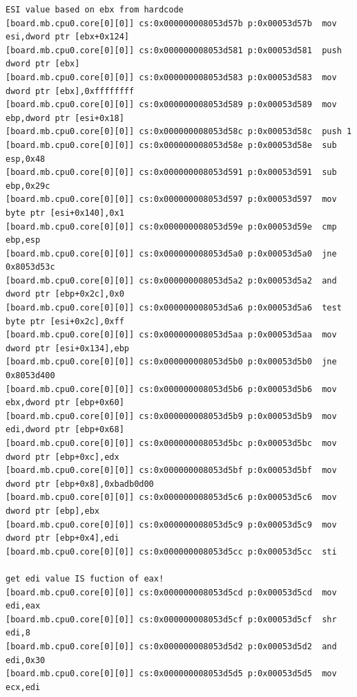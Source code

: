 \documentclass[titlepage]{article}
\begin{document}
\begin{appendices}
\begin{verbatim}
ESI value based on ebx from hardcode
[board.mb.cpu0.core[0][0]] cs:0x000000008053d57b p:0x00053d57b  mov esi,dword ptr [ebx+0x124]
[board.mb.cpu0.core[0][0]] cs:0x000000008053d581 p:0x00053d581  push dword ptr [ebx]
[board.mb.cpu0.core[0][0]] cs:0x000000008053d583 p:0x00053d583  mov dword ptr [ebx],0xffffffff
[board.mb.cpu0.core[0][0]] cs:0x000000008053d589 p:0x00053d589  mov ebp,dword ptr [esi+0x18]
[board.mb.cpu0.core[0][0]] cs:0x000000008053d58c p:0x00053d58c  push 1
[board.mb.cpu0.core[0][0]] cs:0x000000008053d58e p:0x00053d58e  sub esp,0x48
[board.mb.cpu0.core[0][0]] cs:0x000000008053d591 p:0x00053d591  sub ebp,0x29c
[board.mb.cpu0.core[0][0]] cs:0x000000008053d597 p:0x00053d597  mov byte ptr [esi+0x140],0x1
[board.mb.cpu0.core[0][0]] cs:0x000000008053d59e p:0x00053d59e  cmp ebp,esp
[board.mb.cpu0.core[0][0]] cs:0x000000008053d5a0 p:0x00053d5a0  jne 0x8053d53c
[board.mb.cpu0.core[0][0]] cs:0x000000008053d5a2 p:0x00053d5a2  and dword ptr [ebp+0x2c],0x0
[board.mb.cpu0.core[0][0]] cs:0x000000008053d5a6 p:0x00053d5a6  test byte ptr [esi+0x2c],0xff
[board.mb.cpu0.core[0][0]] cs:0x000000008053d5aa p:0x00053d5aa  mov dword ptr [esi+0x134],ebp
[board.mb.cpu0.core[0][0]] cs:0x000000008053d5b0 p:0x00053d5b0  jne 0x8053d400
[board.mb.cpu0.core[0][0]] cs:0x000000008053d5b6 p:0x00053d5b6  mov ebx,dword ptr [ebp+0x60]
[board.mb.cpu0.core[0][0]] cs:0x000000008053d5b9 p:0x00053d5b9  mov edi,dword ptr [ebp+0x68]
[board.mb.cpu0.core[0][0]] cs:0x000000008053d5bc p:0x00053d5bc  mov dword ptr [ebp+0xc],edx
[board.mb.cpu0.core[0][0]] cs:0x000000008053d5bf p:0x00053d5bf  mov dword ptr [ebp+0x8],0xbadb0d00
[board.mb.cpu0.core[0][0]] cs:0x000000008053d5c6 p:0x00053d5c6  mov dword ptr [ebp],ebx
[board.mb.cpu0.core[0][0]] cs:0x000000008053d5c9 p:0x00053d5c9  mov dword ptr [ebp+0x4],edi
[board.mb.cpu0.core[0][0]] cs:0x000000008053d5cc p:0x00053d5cc  sti

get edi value IS fuction of eax!
[board.mb.cpu0.core[0][0]] cs:0x000000008053d5cd p:0x00053d5cd  mov edi,eax
[board.mb.cpu0.core[0][0]] cs:0x000000008053d5cf p:0x00053d5cf  shr edi,8
[board.mb.cpu0.core[0][0]] cs:0x000000008053d5d2 p:0x00053d5d2  and edi,0x30
[board.mb.cpu0.core[0][0]] cs:0x000000008053d5d5 p:0x00053d5d5  mov ecx,edi


\end{verbatim}
\end{appendices}
\end{document}
